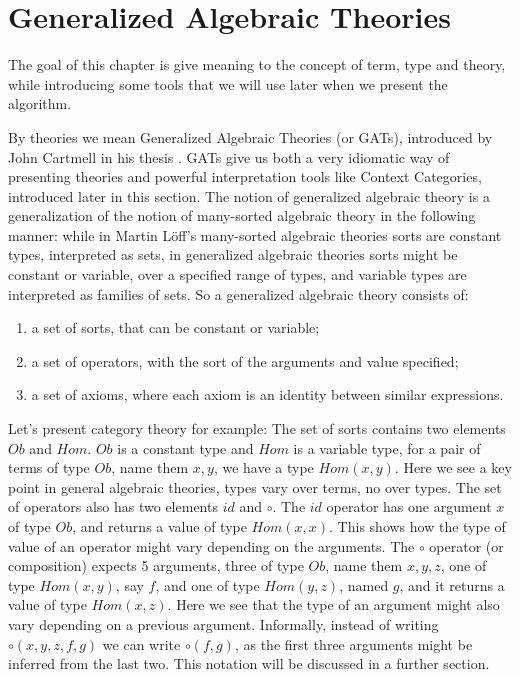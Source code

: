 \chapter[Generalized Algebraic Theories]{Generalized Algebraic Theories}

The goal of this chapter is give meaning to the concept of 
term, type and theory, while introducing some tools that we will
use later when we present the algorithm.

By theories we mean Generalized Algebraic Theories (or GATs), 
introduced by John Cartmell in his thesis \cite{cartmell1978} \cite{cartmell1986}.
GATs give us both a very idiomatic way of presenting
theories and powerful interpretation tools like
Context Categories, introduced later in this section.
The notion of generalized algebraic theory is a generalization of
the notion of many-sorted algebraic theory in the following manner:
while in Martin L{\"o}ff's many-sorted algebraic theories sorts
are constant types, interpreted as sets, in generalized
algebraic theories sorts might be constant or variable,
over a specified range of types, and variable types
are interpreted as families of sets. So a generalized
algebraic theory consists of:
\begin{enumerate}
    \item a set of sorts, that can be constant or variable;
    \item a set of operators, with the sort of the arguments and value specified;
    \item a set of axioms, where each axiom is an identity between similar expressions. 
\end{enumerate}
Let's present category theory for example:
The set of sorts contains two elements $Ob$ and $Hom$.
$Ob$ is a constant type and $Hom$ is a variable type,
for a pair of terms of type $Ob$, name them $x, y$, we
have a type $Hom(x, y)$.
Here we see a key point in general algebraic theories,
types vary over terms, no over types.
The set of operators also has two elements $id$ and $\circ$.
The $id$ operator has one argument $x$ of type $Ob$,
and returns a value of type $Hom(x, x)$. This shows
how the type of value of an operator might vary depending
on the arguments. 
The $\circ$ operator (or composition) expects 5 arguments, 
three of type $Ob$, name them $x, y, z$, one of type $Hom(x, y)$,
say $f$, and one of type $Hom(y, z)$, named $g$, and it returns
a value of type $Hom(x, z)$.
Here we see that the type of an argument might also vary depending
on a previous argument.
{\color{red}Informally, instead of writing $\circ(x, y, z, f, g)$ we can
write $\circ(f, g)$, as the first three arguments might be inferred from the last two.
This notation will be discussed in a further section.}

